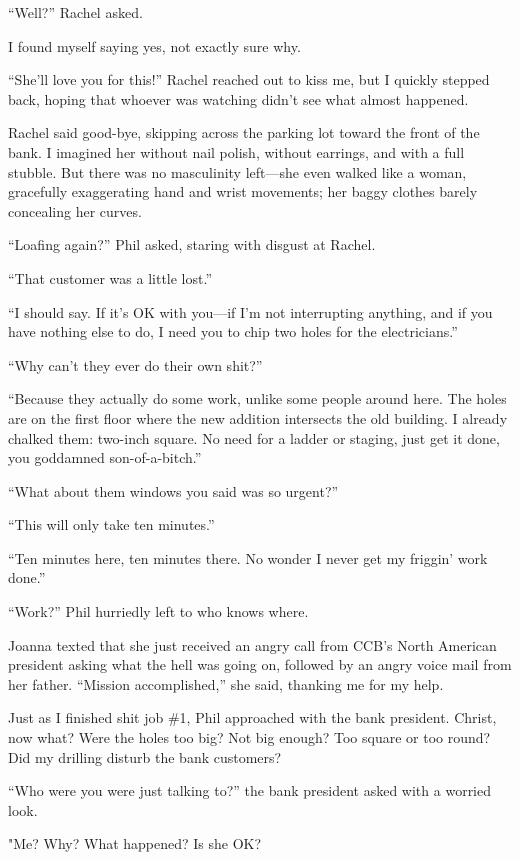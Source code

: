 \noindent ``Well?'' Rachel asked.

I found myself saying yes, not exactly sure why.

``She'll love you for this!'' Rachel reached out to kiss me, but I
quickly stepped back, hoping that whoever was watching didn't see what
almost happened.

Rachel said good-bye, skipping across the parking lot toward the front
of the bank. I imagined her without nail polish, without earrings, and
with a full stubble. But there was no masculinity left---she even walked
like a woman, gracefully exaggerating hand and wrist movements; her
baggy clothes barely concealing her curves.

``Loafing again?'' Phil asked, staring with disgust at Rachel.

``That customer was a little lost.''

``I should say. If it's OK with you---if I'm not interrupting anything,
and if you have nothing else to do, I need you to chip two holes for the
electricians.''

``Why can't they ever do their own shit?''

``Because they actually do some work, unlike some people around here.
The holes are on the first floor where the new addition intersects the
old building. I already chalked them: two-inch square. No need for a
ladder or staging, just get it done, you goddamned son-of-a-bitch.''

``What about them windows you said was so urgent?''

``This will only take ten minutes.''

``Ten minutes here, ten minutes there. No wonder I never get my friggin'
work done.''

``Work?'' Phil hurriedly left to who knows where.

Joanna texted that she just received an angry call from CCB's North
American president asking what the hell was going on, followed by an
angry voice mail from her father. ``Mission accomplished,'' she said,
thanking me for my help.

Just as I finished shit job \#1, Phil approached with the bank
president. Christ, now what? Were the holes too big? Not big enough? Too
square or too round? Did my drilling disturb the bank customers?

``Who were you were just talking to?'' the bank president asked with a
worried look.

"Me? Why? What happened? Is she OK?

